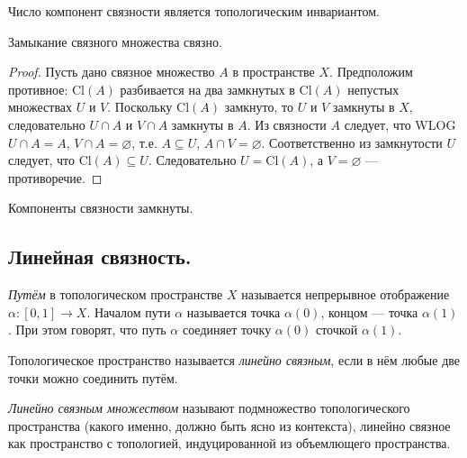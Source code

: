 \documentclass[12pt,a4paper]{article}
\newcommand{\Cl}{\ensuremath{\mathrm{Cl}}\xspace}
\begin{document}
    \begin{corollary}
        Число компонент связности является топологическим инвариантом.
    \end{corollary}

    \begin{theorem}
        Замыкание связного множества связно.
    \end{theorem}

    \begin{proof}
        Пусть дано связное множество $A$ в пространстве $X$. Предположим противное: $\Cl(A)$ разбивается на два замкнутых в $\Cl(A)$ непустых множествах $U$ и $V$. Поскольку $\Cl(A)$ замкнуто, то $U$ и $V$ замкнуты в $X$, следовательно $U \cap A$ и $V \cap A$ замкнуты в $A$. Из связности $A$ следует, что WLOG $U \cap A = A$, $V \cap A = \varnothing$, т.е. $A \subseteq U$, $A \cap V = \varnothing$. Соответственно из замкнутости $U$ следует, что $\Cl(A) \subseteq U$. Следовательно $U = \Cl(A)$, а $V = \varnothing$ --- противоречие.
    \end{proof}

    \begin{corollary}
        Компоненты связности замкнуты.
    \end{corollary}

    \subsection{Линейная связность.}

    \begin{definition}
        \emph{Путём} в топологическом пространстве $X$ называется непрерывное отображение $\alpha: [0,1] \to X$. Началом пути $\alpha$ называется точка $\alpha(0)$, концом --- точка $\alpha(1)$. При этом говорят, что путь $\alpha$ соединяет точку $\alpha(0)$ сточкой $\alpha(1)$.
    \end{definition}

    \begin{definition}
        Топологическое пространство называется \emph{линейно связным}, если в нём любые две точки можно соединить путём.
    \end{definition}

    \begin{remark*}
        \emph{Линейно связным множеством} называют подмножество топологического пространства (какого именно, должно быть ясно из контекста), линейно связное как пространство с топологией, индуцированной из объемлющего пространства.
    \end{remark*}
\end{document}
